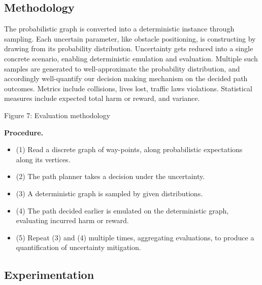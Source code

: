 \subsection{Methodology} \label{Methodology}

The probabilistic graph is converted into a deterministic instance through sampling. Each uncertain parameter, like obstacle positioning, is constructing by drawing from its probability distribution. Uncertainty gets reduced into a single concrete scenario, enabling deterministic emulation and evaluation. Multiple such samples are generated to well-approximate the probability distribution, and accordingly well-quantify our decision making mechanism on the decided path outcomes. Metrics include collisions, lives lost, traffic laws violations. Statistical measures include expected total harm or reward, and variance.


\begin{center}
    Figure 7: Evaluation methodology
\end{center}

\textbf{Procedure.}
\begin{itemize}
    \item (1) Read a discrete graph of way-points, along probabilistic expectations along its vertices.
    \item (2) The path planner takes a decision under the uncertainty.
    \item (3) A deterministic graph is sampled by given distributions.
    \item (4) The path decided earlier is emulated on the deterministic graph, evaluating incurred harm or reward.
    \item (5) Repeat (3) and (4) multiple times, aggregating evaluations, to produce a quantification of uncertainty mitigation.
\end{itemize}

\subsection{Experimentation} \label{Experimentation}

